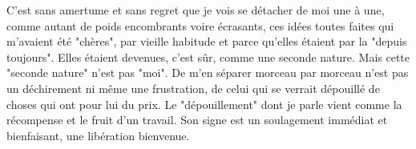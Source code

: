 C'est sans amertume et sans regret que je vois se détacher de moi une à une, comme autant de poids encombrants voire écrasants, ces idées toutes faites qui m'avaient été "chères", par vieille habitude et parce qu'elles étaient par la "depuis toujours". Elles étaient devenues, c'est sûr, comme une seconde nature. Mais cette "seconde nature" n'est pas "moi". De m'en séparer morceau par morceau n'est pas un déchirement ni même une frustration, de celui qui se verrait dépouillé de choses qui ont pour lui du prix. Le "dépouillement" dont je parle vient comme la récompense et le fruit d'un travail. Son signe est un soulagement immédiat et bienfaisant, une libération bienvenue.





